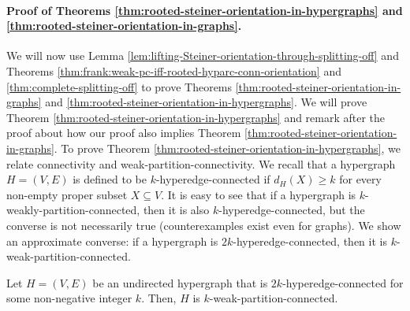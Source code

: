 \paragraph{Proof of Theorems \ref{thm:rooted-steiner-orientation-in-hypergraphs} and \ref{thm:rooted-steiner-orientation-in-graphs}.}
We will now use Lemma \ref{lem:lifting-Steiner-orientation-through-splitting-off} and Theorems \ref{thm:frank:weak-pc-iff-rooted-hyparc-conn-orientation} and \ref{thm:complete-splitting-off} to prove Theorems \ref{thm:rooted-steiner-orientation-in-graphs} and \ref{thm:rooted-steiner-orientation-in-hypergraphs}. 
We will prove Theorem \ref{thm:rooted-steiner-orientation-in-hypergraphs} and remark after the proof about how our proof also implies Theorem \ref{thm:rooted-steiner-orientation-in-graphs}. 
To prove Theorem \ref{thm:rooted-steiner-orientation-in-hypergraphs}, we relate connectivity and weak-partition-connectivity. We recall that a hypergraph $H=(V, E)$ is defined to be $k$-hyperedge-connected if $d_H(X)\ge k$ for every non-empty proper subset $X\subseteq V$. 
It is easy to see that if a hypergraph is $k$-weakly-partition-connected, then it is also $k$-hyperedge-connected, but the converse is not necessarily true (counterexamples exist even for graphs). We show an approximate converse: if a hypergraph is $2k$-hyperedge-connected, then it is $k$-weak-partition-connected.
\begin{lemma}\label{lem:2k-conn-implies-k-weak-pc}
    Let $H = (V, E)$ be an undirected hypergraph that is $2k$-hyperedge-connected for some non-negative integer $k$. Then, $H$ is $k$-weak-partition-connected.
\end{lemma}
